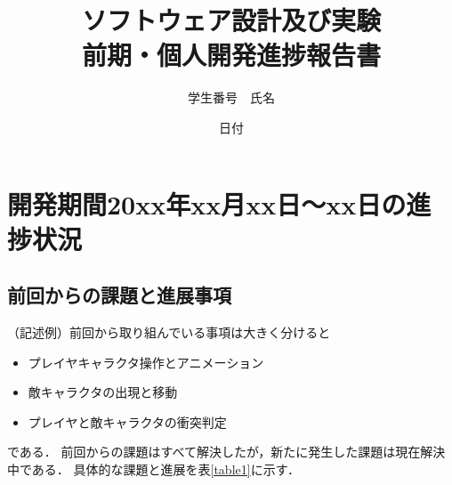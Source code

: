 \documentclass{jsarticle}
\title{ソフトウェア設計及び実験\\前期・個人開発進捗報告書}
\author{学生番号　氏名}
\date{日付}
\begin{document}
\maketitle

\section{開発期間20xx年xx月xx日～xx日の進捗状況}

\subsection{前回からの課題と進展事項}
（記述例）前回から取り組んでいる事項は大きく分けると

\begin{itemize}
\item プレイヤキャラクタ操作とアニメーション
\item 敵キャラクタの出現と移動
\item プレイヤと敵キャラクタの衝突判定
\end{itemize}

である．
前回からの課題はすべて解決したが，新たに発生した課題は現在解決中である．
具体的な課題と進展を表\ref{table1}に示す．
\end{document}
